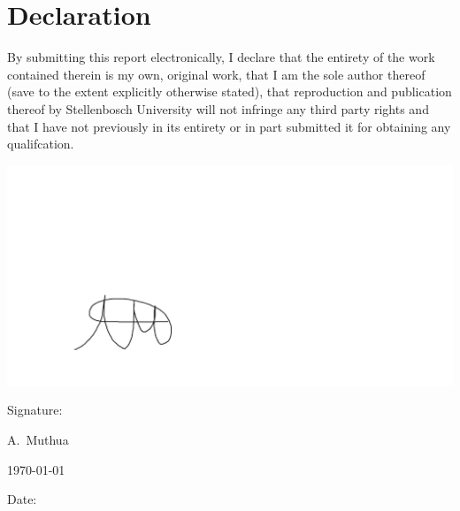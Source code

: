 \chapter{Declaration}

By submitting this report electronically, I declare that the entirety of the work contained
therein is my own, original work, that I am the sole author thereof (save to the extent
explicitly otherwise stated), that reproduction and publication thereof by Stellenbosch
University will not infringe any third party rights and that I have not previously in its
entirety or in part submitted it for obtaining any qualifcation.

\vspace{3cm}
\hspace{2cm}
\includegraphics[width=0.4\linewidth]{./Figures/Signature-Alex.png}\\
\noindent%
\parbox{.5\textwidth}{%
  Signature:\quad\dotfill\par
  \hfill A.\ Muthua\hspace{1.2cm}\null}


\vspace{1.2cm}
\hspace{2cm}
\today \\
\noindent%
\parbox{.5\textwidth}{%
  Date:\quad\dotfill\par}
